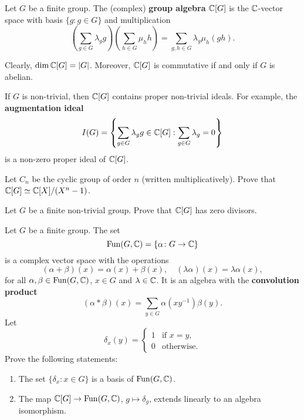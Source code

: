 \chapter{}


Let $G$ be a finite group. The (complex) \textbf{group
algebra} $\mathbb{C}[G]$ is the $\mathbb{C}$-vector space with
basis $\{g:g\in G\}$ and multiplication
\[
\left(\sum_{g\in G}\lambda_gg\right)\left(\sum_{h\in G}\mu_hh\right)
=\sum_{g,h\in G}\lambda_g\mu_h(gh).
\]

Clearly, $\dim \mathbb{C}[G]=|G|$. Moreover, 
$\mathbb{C}[G]$ is commutative if and only if $G$ is abelian. 

If $G$ is non-trivial, 
then $\mathbb{C}[G]$ contains proper non-trivial ideals. For example, 
the \textbf{augmentation ideal} 
\[
I(G)=\left\{\sum_{g\in G}\lambda_gg\in \mathbb{C}[G]:\sum_{g\in G}\lambda_g=0\right\}
\]
is a non-zero proper ideal of $\mathbb{C}[G]$. 

\begin{exercise}
Let $C_n$ be the cyclic group of order $n$ (written multiplicatively).
Prove that $\mathbb{C}[G]\simeq \mathbb{C}[X]/(X^n-1)$. 
\end{exercise}

\begin{exercise}
    Let $G$ be a finite non-trivial group. Prove that
    $\mathbb{C}[G]$ has zero divisors. 
\end{exercise}

\begin{exercise}
    Let $G$ be a finite group. The set
    \[
    \operatorname{Fun}(G,\mathbb{C})=\{\alpha\colon G\to\mathbb{C}\}
    \]
    is a complex vector space with 
    the operations 
    \[
    (\alpha+\beta)(x)=\alpha(x)+\beta(x),
    \quad
    (\lambda\alpha)(x)=\lambda\alpha(x),
    \]
    for all $\alpha,\beta\in\operatorname{Fun}(G,\mathbb{C})$, $x\in G$ 
    and $\lambda\in\mathbb{C}$. It is an algebra
    with the \textbf{convolution product} 
    \[
    (\alpha*\beta)(x)=\sum_{y\in G}\alpha(xy^{-1})\beta(y).
    \]
    Let 
    \[
    \delta_x(y)=\begin{cases}
            1 & \text{if $x=y$},\\
            0 & \text{otherwise}.
        \end{cases}
    \]
    Prove the following statements:
    \begin{enumerate}
        \item 
        The set $\{\delta_x:x\in G\}$ is a basis
        of $\operatorname{Fun}(G,\mathbb{C})$. 
        \item The map $\mathbb{C}[G]\to\operatorname{Fun}(G,\mathbb{C})$, $g\mapsto\delta_g$, 
            extends linearly to an algebra isomorphism. 
    \end{enumerate}
\end{exercise}



